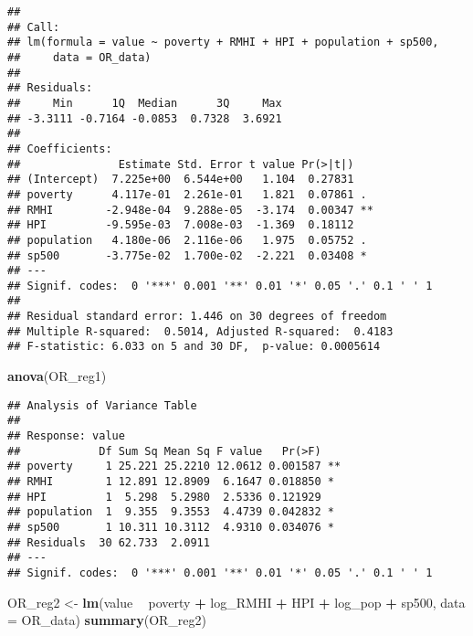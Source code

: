 \documentclass[
]{article}
\newenvironment{Shaded}{\begin{snugshade}}{\end{snugshade}}
\newcommand{\DataTypeTok}[1]{\textcolor[rgb]{0.13,0.29,0.53}{#1}}
\newcommand{\KeywordTok}[1]{\textcolor[rgb]{0.13,0.29,0.53}{\textbf{#1}}}
\newcommand{\NormalTok}[1]{#1}
\newcommand{\OperatorTok}[1]{\textcolor[rgb]{0.81,0.36,0.00}{\textbf{#1}}}
\newcommand{\StringTok}[1]{\textcolor[rgb]{0.31,0.60,0.02}{#1}}
\begin{document}
\begin{verbatim}
## 
## Call:
## lm(formula = value ~ poverty + RMHI + HPI + population + sp500, 
##     data = OR_data)
## 
## Residuals:
##     Min      1Q  Median      3Q     Max 
## -3.3111 -0.7164 -0.0853  0.7328  3.6921 
## 
## Coefficients:
##               Estimate Std. Error t value Pr(>|t|)   
## (Intercept)  7.225e+00  6.544e+00   1.104  0.27831   
## poverty      4.117e-01  2.261e-01   1.821  0.07861 . 
## RMHI        -2.948e-04  9.288e-05  -3.174  0.00347 **
## HPI         -9.595e-03  7.008e-03  -1.369  0.18112   
## population   4.180e-06  2.116e-06   1.975  0.05752 . 
## sp500       -3.775e-02  1.700e-02  -2.221  0.03408 * 
## ---
## Signif. codes:  0 '***' 0.001 '**' 0.01 '*' 0.05 '.' 0.1 ' ' 1
## 
## Residual standard error: 1.446 on 30 degrees of freedom
## Multiple R-squared:  0.5014, Adjusted R-squared:  0.4183 
## F-statistic: 6.033 on 5 and 30 DF,  p-value: 0.0005614
\end{verbatim}

\begin{Shaded}
\begin{Highlighting}[]
\KeywordTok{anova}\NormalTok{(OR_reg1)}
\end{Highlighting}
\end{Shaded}

\begin{verbatim}
## Analysis of Variance Table
## 
## Response: value
##            Df Sum Sq Mean Sq F value   Pr(>F)   
## poverty     1 25.221 25.2210 12.0612 0.001587 **
## RMHI        1 12.891 12.8909  6.1647 0.018850 * 
## HPI         1  5.298  5.2980  2.5336 0.121929   
## population  1  9.355  9.3553  4.4739 0.042832 * 
## sp500       1 10.311 10.3112  4.9310 0.034076 * 
## Residuals  30 62.733  2.0911                    
## ---
## Signif. codes:  0 '***' 0.001 '**' 0.01 '*' 0.05 '.' 0.1 ' ' 1
\end{verbatim}

\begin{Shaded}
\begin{Highlighting}[]
\NormalTok{OR_reg2 <-}\StringTok{ }\KeywordTok{lm}\NormalTok{(value }\OperatorTok{~}\StringTok{ }\NormalTok{poverty }\OperatorTok{+}\StringTok{ }\NormalTok{log_RMHI }\OperatorTok{+}\StringTok{ }\NormalTok{HPI }\OperatorTok{+}\StringTok{ }\NormalTok{log_pop }\OperatorTok{+}\StringTok{ }\NormalTok{sp500, }\DataTypeTok{data =}\NormalTok{ OR_data)}
\KeywordTok{summary}\NormalTok{(OR_reg2)}
\end{Highlighting}
\end{Shaded}
\end{document}
